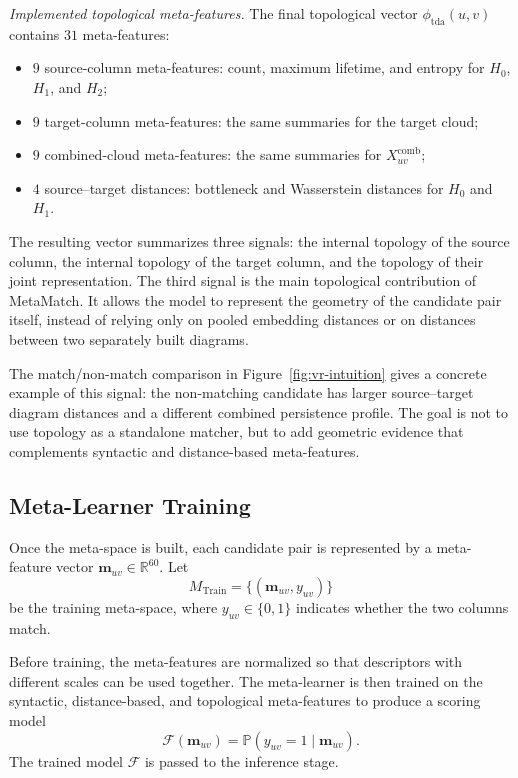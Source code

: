 \documentclass[sigconf, nonacm]{acmart}
\newcommand{\R}{\mathbb{R}}
\begin{document}
\noindent\textit{Implemented topological meta-features.}
The final topological vector \(\phi_{\mathrm{tda}}(u,v)\) contains \(31\) meta-features:
\begin{itemize}[leftmargin=*]
    \item \(9\) source-column meta-features: count, maximum lifetime, and entropy for \(H_0\), \(H_1\), and \(H_2\);
    \item \(9\) target-column meta-features: the same summaries for the target cloud;
    \item \(9\) combined-cloud meta-features: the same summaries for \(X_{uv}^{\mathrm{comb}}\);
    \item \(4\) source--target distances: bottleneck and Wasserstein distances for \(H_0\) and \(H_1\).
\end{itemize}

The resulting vector summarizes three signals: the internal topology of the source column, the internal topology of the target column, and the topology of their joint representation. The third signal is the main topological contribution of MetaMatch. It allows the model to represent the geometry of the candidate pair itself, instead of relying only on pooled embedding distances or on distances between two separately built diagrams.

The match/non-match comparison in Figure~\ref{fig:vr-intuition} gives a concrete example of this signal: the non-matching candidate has larger source--target diagram distances and a different combined persistence profile. The goal is not to use topology as a standalone matcher, but to add geometric evidence that complements syntactic and distance-based meta-features.



\subsection{\textbf{Meta-Learner Training}}

Once the meta-space is built, each candidate pair is represented by a meta-feature vector \(\mathbf{m}_{uv}\in\R^{60}\). Let
\[
M_{\mathrm{Train}}=\{(\mathbf{m}_{uv},y_{uv})\}
\]
be the training meta-space, where \(y_{uv}\in\{0,1\}\) indicates whether the two columns match.

Before training, the meta-features are normalized so that descriptors with different scales can be used together. The meta-learner is then trained on the syntactic, distance-based, and topological meta-features to produce a scoring model
\[
\mathcal{F}(\mathbf{m}_{uv})=\mathbb{P}(y_{uv}=1\mid \mathbf{m}_{uv}).
\]
The trained model \(\mathcal{F}\) is passed to the inference stage.
\end{document}
